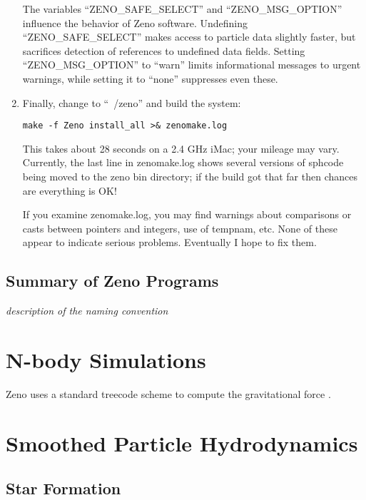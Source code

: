 \documentclass[11pt,letterpaper]{article}
\begin{document}
\begin{enumerate}
{The variables ``ZENO\_SAFE\_SELECT'' and ``ZENO\_MSG\_OPTION'' influence the behavior of Zeno software.  Undefining ``ZENO\_SAFE\_SELECT'' makes access to particle data slightly faster, but sacrifices detection of references to undefined data fields.  Setting ``ZENO\_MSG\_OPTION'' to ``warn'' limits informational messages to urgent warnings, while setting it to ``none'' suppresses even these.}
\item{Finally, change to ``~/zeno'' and build the system:
\begin{verbatim}
make -f Zeno install_all >& zenomake.log
\end{verbatim}
This takes about 28 seconds on a 2.4 GHz iMac; your mileage may vary.  Currently, the last line in zenomake.log shows several versions of sphcode being moved to the zeno bin directory; if the build got that far then chances are everything is OK!

If you examine zenomake.log, you may find warnings about comparisons or casts between pointers and integers, use of tempnam, etc.  None of these appear to indicate serious problems.  Eventually I hope to fix them.}
\end{enumerate}

\subsection{Summary of Zeno Programs}
\label{ssec:programs}

\emph{description of the naming convention}

\section{N-body Simulations}
\label{sec:Nbody}

Zeno uses a standard treecode scheme to compute the gravitational force \citep{Barnes1986}. 

\section{Smoothed Particle Hydrodynamics}
\label{sec:SPH}

\subsection{Star Formation}
\end{document}
